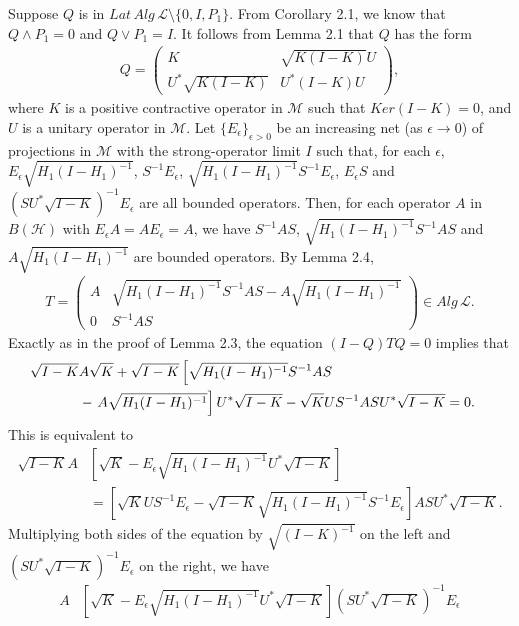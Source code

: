 \documentclass[12pt]{article}
\newcommand{\HHH}{\mathcal H} %
\newcommand{\LLL}{\mathcal L} %
\newcommand{\MMM}{\mathcal M}
\begin{document}
{\quad Suppose  $Q$ is in $Lat\,Alg\,\LLL
\setminus \{0, I, P_{1}\}$. From Corollary 2.1, we know that
$Q\wedge P_1=0$ and $Q\vee P_1=I$. It follows from Lemma 2.1 that
$Q$ has the form
\begin{align*}
Q = \left(\begin{array}{cc}K & \sqrt{K(I-K)}U \\U^{*}\sqrt{K(I-K)} &
U^{*}(I-K)U \end{array}\right),
\end{align*}
where $K$ is a positive contractive operator in $\MMM$ such that
$Ker(I-K)=0$, and $U$ is a unitary operator in $\MMM$. Let
$\{E_\epsilon \}_{\epsilon>0}$ be an increasing net (as $\epsilon
\rightarrow 0$) of projections in $\MMM$ with the strong-operator
limit $I$ such that, for each $\epsilon$, $E_\epsilon \sqrt{H_1 (I -
H_1)^{-1}}$, $S^{-1}E_\epsilon$, $\sqrt{H_1(I-H_1)^{-1}}S^{-1}
E_\epsilon$, $E_{\epsilon}S$ and $(SU^{*}\sqrt{I-K})^{-1}E_\epsilon$
are all bounded operators. Then, for each operator $A$ in $B(\HHH)$
with $E_\epsilon A = A E_\epsilon = A$, we have $S^{-1}AS$,
$\sqrt{H_{1}(I-H_{1})^{-1}}S^{-1}AS$ and
$A\sqrt{H_{1}(I-H_{1})^{-1}}$ are bounded operators. By Lemma 2.4,
\begin{align*}
T = \left(\begin{array}{cc}A & \sqrt{H_{1}(I-H_{1})^{-1}}S^{-1}AS
-A\sqrt{H_{1}(I-H_{1})^{-1}}  \\0 & S^{-1}AS \end{array}\right) \in
 Alg\,\LLL.
\end{align*}
Exactly as in the proof of  Lemma 2.3, the equation $(I-Q)TQ = 0$
implies that
\begin{align*}
\sqrt{I-K}&A\sqrt{K} +
\sqrt{I-K}\left[\sqrt{H_{1}(I-H_{1})^{-1}}S^{-1}AS \right.\cr & -
\left.A\sqrt{H_{1}(I-H_{1})^{-1}}\right]U^{*}\sqrt{I-K} -
\sqrt{K}US^{-1}ASU^{*}\sqrt{I-K} = 0.
\end{align*}
This is equivalent to
\begin{align*}
\sqrt{I-K}A&\left[\sqrt{K} -
E_{\epsilon}\sqrt{H_{1}(I-H_{1})^{-1}}U^{*}\sqrt{I-K}\right]\\
& =\left[\sqrt{K}US^{-1}E_{\epsilon} -
\sqrt{I-K}\sqrt{H_{1}(I-H_{1})^{-1}}S^{-1}E_{\epsilon}\right]ASU^{*}\sqrt{I-K}.
\end{align*}
Multiplying both sides of the equation by $\sqrt{(I-K)^{-1}}$ on the
left and $(SU^{*}\sqrt{I-K})^{-1}E_\epsilon$ on the right, we have
\begin{align*}
A&\left[\sqrt{K} -
E_\epsilon\sqrt{H_{1}(I-H_{1})^{-1}}U^{*}\sqrt{I-K}\right](SU^{*}\sqrt{I-K})^{-1}E_\epsilon \\

\end{align*}}
\end{document}
